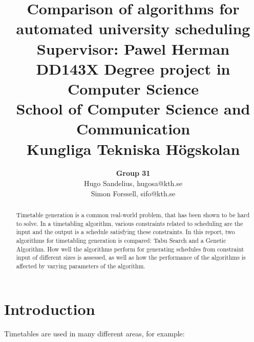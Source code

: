 \documentclass[titlepage,a4paper]{article}
\title{
\Huge{Comparison of algorithms for automated university scheduling}
    \bigskip
	\large{
	\textbf{Supervisor:} Pawel Herman \\
	DD143X Degree project in Computer Science \\
	School of Computer Science and Communication \\
	Kungliga Tekniska Högskolan
	}
}
\author{
\textbf{Group 31} \\
Hugo Sandelius, hugosa@kth.se \\ 
Simon Forssell, sifo@kth.se \\
}
\begin{document}
\maketitle

\begin{abstract}
Timetable generation is a common real-world problem, that has been shown to be hard to solve. In a timetabling algorithm, various constraints related to scheduling are the input and the output is a schedule satisfying these constraints.
In this report, two algorithms for timetabling generation is compared: Tabu Search and a Genetic Algorithm. How well the algorithms perform for generating schedules from constraint input of different sizes is assessed, as well as how the performance of the algorithms is affected by varying parameters of the algorithm.
\end{abstract}

\tableofcontents{}

\pagebreak
\section{Introduction}
Timetables are used in many different areas, for example:
\end{document}
